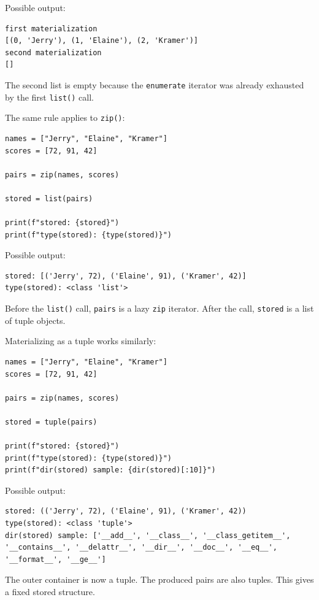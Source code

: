 \documentclass[a4paper,twoside]{report}
\begin{document}
Possible output:

\begin{verbatim}
first materialization
[(0, 'Jerry'), (1, 'Elaine'), (2, 'Kramer')]
second materialization
[]
\end{verbatim}

The second list is empty because the \texttt{enumerate} iterator was already exhausted by the first \texttt{list()} call.

The same rule applies to \texttt{zip()}:

\begin{verbatim}
names = ["Jerry", "Elaine", "Kramer"]
scores = [72, 91, 42]

pairs = zip(names, scores)

stored = list(pairs)

print(f"stored: {stored}")
print(f"type(stored): {type(stored)}")
\end{verbatim}

Possible output:

\begin{verbatim}
stored: [('Jerry', 72), ('Elaine', 91), ('Kramer', 42)]
type(stored): <class 'list'>
\end{verbatim}

Before the \texttt{list()} call, \texttt{pairs} is a lazy \texttt{zip} iterator. After the call, \texttt{stored} is a list of tuple objects.

Materializing as a tuple works similarly:

\begin{verbatim}
names = ["Jerry", "Elaine", "Kramer"]
scores = [72, 91, 42]

pairs = zip(names, scores)

stored = tuple(pairs)

print(f"stored: {stored}")
print(f"type(stored): {type(stored)}")
print(f"dir(stored) sample: {dir(stored)[:10]}")
\end{verbatim}

Possible output:

\begin{verbatim}
stored: (('Jerry', 72), ('Elaine', 91), ('Kramer', 42))
type(stored): <class 'tuple'>
dir(stored) sample: ['__add__', '__class__', '__class_getitem__',
'__contains__', '__delattr__', '__dir__', '__doc__', '__eq__',
'__format__', '__ge__']
\end{verbatim}

The outer container is now a tuple. The produced pairs are also tuples. This gives a fixed stored structure.
\end{document}
